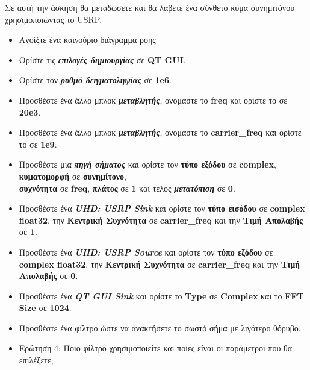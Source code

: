 \documentclass[12pt]{report}
\begin{document}
            Σε αυτή την άσκηση θα μεταδώσετε και θα λάβετε ένα σύνθετο κύμα συνημιτόνου χρησιμοποιώντας το USRP.

            \begin{itemize}
                \item Ανοίξτε ένα καινούριο διάγραμμα ροής
                \item Ορίστε τις \textbf{\textit{επιλογές δημιουργίας}} σε \textbf{QT GUI}.
                \item Ορίστε τον \textbf{\textit{ρυθμό δειγματοληψίας}} σε \textbf{1e6}.
                \item Προσθέστε ένα άλλο μπλοκ \textbf{\textit{μεταβλητής}}, 
                    ονομάστε το \textbf{freq} και ορίστε το σε \textbf{20e3}.
                \item Προσθέστε ένα άλλο μπλοκ \textbf{\textit{μεταβλητής}}, 
                    ονομάστε το \textbf{carrier\_freq} και ορίστε το σε \textbf{1e9}.
                \item Προσθέστε μια \textbf{\textit{πηγή σήματος}} και ορίστε τον \textbf{τύπο εξόδου}
                    σε \textbf{complex}, \textbf{κυματομορφή} σε \textbf{συνημίτονο},\\
                    \textbf{συχνότητα} σε \textbf{freq}, \textbf{πλάτος} σε \textbf{1} και τέλος 
                \textbf{\textit{μετατόπιση}} σε \textbf{0}.
                \item Προσθέστε ένα \textbf{\textit{UHD: USRP Sink}} και ορίστε τον \textbf{τύπο εισόδου}
                    σε \textbf{complex float32}, την \textbf{Κεντρική Συχνότητα} σε \textbf{carrier\_freq} και την
                    \textbf{Τιμή Απολαβής} σε \textbf{1}.
                \item Προσθέστε ένα \textbf{\textit{UHD: USRP Source}} και ορίστε τον \textbf{τύπο εξόδου}
                    σε \textbf{complex float32}, την \textbf{Κεντρική Συχνότητα} σε \textbf{carrier\_freq} και την
                    \textbf{Τιμή Απολαβής} σε \textbf{0}.
                \item Προσθέστε ένα \textbf{\textit{QT GUI Sink}} και ορίστε το \textbf{Type} σε \textbf{Complex}
                και το \textbf{FFT Size} σε \textbf{1024}.
                \item Προσθέστε ένα φίλτρο ώστε να ανακτήσετε το σωστό σήμα με λιγότερο θόρυβο.
                \item \textsf{Ερώτηση 4: Ποιο φίλτρο χρησιμοποιείτε και ποιες είναι οι παράμετροι που θα επιλέξετε;}
            \end{itemize}
\end{document}
